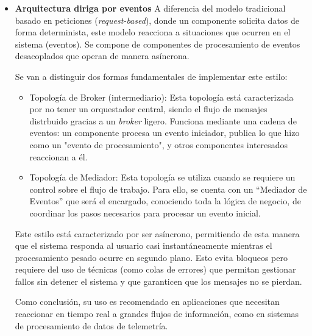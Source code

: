 \begin{itemize}
    Como conclusión, este estilo es usado para aplicaciones que necesitan un buen equilibrio entre agilidad, costo y escalabilidad, 
    especialmente cuando el dominio del negocio tiene un acoplamiento semántico que dificultaría mucho el uso de microservicios.

    \item \textbf{Arquitectura diriga por eventos} 
    \newline
    A diferencia del modelo tradicional basado en peticiones (\textit{request-based}), donde un componente solicita datos de forma 
    determinista, este modelo reacciona a situaciones que ocurren en el sistema (eventos). Se compone de componentes de procesamiento 
    de eventos desacoplados que operan de manera asíncrona. 

    Se van a distinguir dos formas fundamentales de implementar este estilo:

    \begin{itemize}
        \item Topología de Broker (intermediario):
        \newline
        Esta topología está caracterizada por no tener un orquestador central, siendo el flujo de mensajes distrbuido
        gracias a un \textit{broker} ligero. Funciona mediante una cadena de eventos: un componente procesa un evento 
        iniciador, publica lo que hizo como un "evento de procesamiento", y otros componentes interesados reaccionan a él.

        \item Topología de Mediador:
        \newline
        Esta topología se utiliza cuando se requiere un control sobre el flujo de trabajo. Para ello, se cuenta con un
        ``Mediador de Eventos'' que será el encargado, conociendo toda la lógica de negocio, de coordinar los pasos 
        necesarios para procesar un evento inicial.        
    \end{itemize}

    Este estilo está caracterizado por ser asíncrono, permitiendo de esta manera que el sistema responda al usuario casi 
    instantáneamente mientras el procesamiento pesado ocurre en segundo plano. Esto evita bloqueos pero requiere del uso
    de técnicas (como colas de errores) que permitan gestionar fallos sin detener el sistema y que garanticen que los mensajes
    no se pierdan.

    Como conclusión, su uso es recomendado en aplicaciones que necesitan reaccionar en tiempo real a grandes flujos de información, 
    como en sistemas de procesamiento de datos de telemetría.


\end{itemize}
